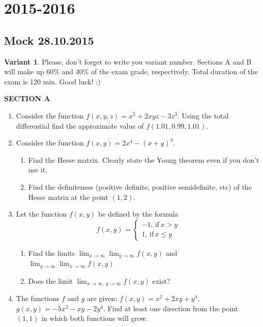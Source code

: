 \documentclass[12pt]{article} %
\theoremstyle{definition} %
\begin{document}
\section{2015-2016}

\subsection{Mock 28.10.2015}


\textbf{Variant 1}. Please, don't forget to write you variant number. Sections A and B will make up 60\% and 40\% of the exam grade, respectively. Total duration of the exam is 120 min. Good luck! :)



\textbf{SECTION A}

\begin{enumerate}

\item Consider the function $f(x,y,z)=x^5+2xyz-3z^3$. Using the total differential find the approximate value of $f(1.01,0.99,1.01)$.

\item Consider the function $f(x,y)=2x^4-(x+y)^3$.
\begin{enumerate}
\item Find the Hesse matrix. Clearly state the Young theorem even if you don't use it.
\item Find the definiteness (positive definite, positive semidefinite, etc) of the Hesse matrix at the point $(1,2)$.
\end{enumerate}

\item Let the function $f(x,y)$ be defined by the formula
\[
f(x,y)=\begin{cases}
-1, \, \text{if} \, x>y \\
1, \, \text{if} \, x\leq y
\end{cases}
\]

\begin{enumerate}
\item Find the limits $\lim_{x\to\infty}\lim_{y\to \infty} f(x,y)$ and $\lim_{y\to\infty}\lim_{x\to \infty} f(x,y)$
\item Does the limit $\lim_{x\to\infty, \, y\to \infty} f(x,y)$ exist?
\end{enumerate}


\item The functions $f$ and $g$ are given: $f(x,y)=x^2+2xy+y^4$, $g(x,y)=-5x^2-xy-2y^4$. Find at least one direction from the point $(1,1)$ in which both functions will grow.


\end{enumerate}
\end{document}
